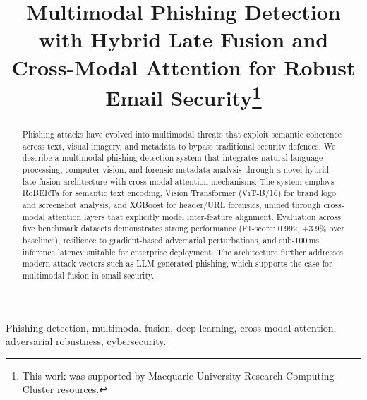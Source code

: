 \documentclass[conference]{IEEEtran}
\begin{document}
\title{Multimodal Phishing Detection with Hybrid Late Fusion and Cross-Modal Attention for Robust Email Security\thanks{This work was supported by Macquarie University Research Computing Cluster resources.}}

\author{
}

\maketitle

\begin{abstract}
Phishing attacks have evolved into multimodal threats that exploit semantic coherence across text, visual imagery, and metadata to bypass traditional security defences. We describe a multimodal phishing detection system that integrates natural language processing, computer vision, and forensic metadata analysis through a novel hybrid late-fusion architecture with cross-modal attention mechanisms. The system employs RoBERTa for semantic text encoding, Vision Transformer (ViT-B/16) for brand logo and screenshot analysis, and XGBoost for header/URL forensics, unified through cross-modal attention layers that explicitly model inter-feature alignment. Evaluation across five benchmark datasets demonstrates strong performance (F1-score: 0.992, +3.9\% over baselines), resilience to gradient-based adversarial perturbations, and sub-100\,ms inference latency suitable for enterprise deployment. The architecture further addresses modern attack vectors such as LLM-generated phishing, which supports the case for multimodal fusion in email security.
\end{abstract}

\begin{IEEEkeywords}
Phishing detection, multimodal fusion, deep learning, cross-modal attention, adversarial robustness, cybersecurity.
\end{IEEEkeywords}

\end{document}
